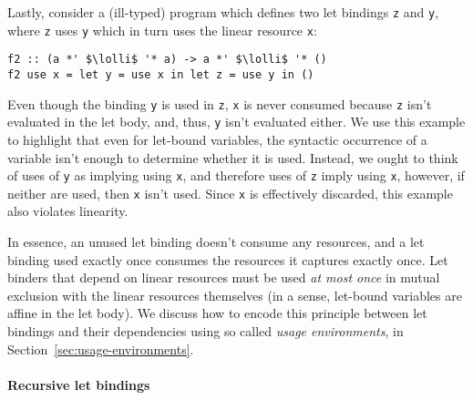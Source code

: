 \documentclass[acmsmall,review,anonymous,screen]{acmart}
\newcommand{\incode}[1]{\lstinline{#1}}
\newcommand{\parawith}[1]{\paragraph{\emph{#1}}}
\newcommand{\lolli}{\multimap}
\begin{document}
Lastly, consider a (ill-typed) program which defines two let bindings \incode{z} and \incode{y}, where
\incode{z} uses \incode{y} which in turn uses the linear resource \incode{x}:
%
\begin{noway}
\begin{lstlisting}
f2 :: (a *' $\lolli$ '* a) -> a *' $\lolli$ '* ()
f2 use x = let y = use x in let z = use y in ()
\end{lstlisting}
\end{noway}
%
Even though the binding \incode{y} is used in \incode{z}, \incode{x} is never
consumed because \incode{z} isn't evaluated in the let body, and, thus,
\incode{y} isn't evaluated either. We use this example to highlight that even
for let-bound variables, the syntactic occurrence of a variable isn't enough to
determine whether it is used. Instead, we ought to think of uses of \incode{y}
as implying using \incode{x}, and therefore uses of \incode{z} imply using
\incode{x}, however, if neither are used, then \incode{x} isn't used. Since
\incode{x} is effectively discarded, this example also violates linearity.

In essence, an unused let binding doesn't consume any resources, and a let
binding used exactly once consumes the resources it captures exactly once. Let
binders that depend on linear resources must be used \emph{at most once} in
mutual exclusion with the linear resources themselves (in a sense,
let-bound variables are affine in the let body).
%
%
We discuss how to encode this principle between let bindings and their dependencies using so called \emph{usage
environments}, in Section~\ref{sec:usage-environments}.

\paragraph{Recursive let bindings\label{sec:semantic-linearity-examples:recursive-lets}}

%
\end{document}
